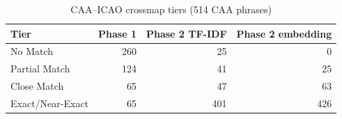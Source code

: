 \begin{table}[t]
\centering
\caption{CAA--ICAO crossmap tiers (514 CAA phrases)}
\label{tab:crossmap}
\begin{tabular}{lrrr}
\toprule
Tier & Phase 1 & Phase 2 TF-IDF & Phase 2 embedding \\
\midrule
No Match & 260 & 25 & 0 \\
Partial Match & 124 & 41 & 25 \\
Close Match & 65 & 47 & 63 \\
Exact/Near-Exact & 65 & 401 & 426 \\
\bottomrule
\end{tabular}
\end{table}
